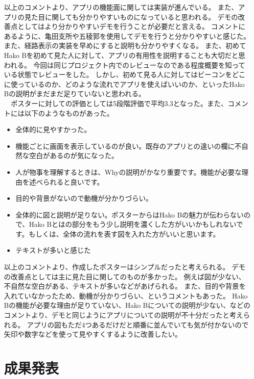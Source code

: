 \documentclass[openany,11pt,papersize]{jsbook}
\begin{document}
以上のコメントより、アプリの機能面に関しては実装が進んでいる。
また、アプリの見た目に関しても分かりやすいものになっていると思われる。
デモの改善点としてはより分かりやすいデモを行うことが必要だと言える。
コメントにあるように、亀田支所や五稜郭を使用してデモを行うと分かりやすいと感じた。
また、経路表示の実装を早めにすると説明も分かりやすくなる。
また、初めてHako Bを初めて見た人に対して、アプリの有用性を説明することも大切だと思われる。
今回は同じプロジェクト内でのレビューなのである程度概要を知っている状態でレビューをした。
しかし、初めて見る人に対してはビーコンをどこに使っているのか、どのような流れでアプリを使えばいいのか、といったHako Bの説明がまだまだ足りていないと思われる。\\
　ポスターに対しての評価としては5段階評価で平均3.3となった。また、コメントには以下のようなものがあった。
\begin{itemize}

\item 全体的に見やすかった。
\item 機能ごとに画面を表示しているのが良い。既存のアプリとの違いの欄に不自然な空白があるのが気になった。
\item 人が物事を理解するときは、Whyの説明がかなり重要です。機能が必要な理由を述べられると良いです。
\item 目的や背景がないので動機が分かりづらい。
\item 全体的に図と説明が足りない。ポスターからはHako Bの魅力が伝わらないので、Hako Bとはの部分をもう少し説明を濃くした方がいいかもしれないです。もしくは、全体の流れを表す図を入れた方がいいと思います。
\item テキストが多いと感じた

\end{itemize}
以上のコメントより、作成したポスターはシンプルだったと考えられる。
デモの改善点としては主に見た目に関してのものが多かった。
例えば図が少ない、不自然な空白がある、テキストが多いなどがあげられる。
また、目的や背景を入れていなかったため、動機が分かりづらい、というコメントもあった。
Hako Bの機能が必要な理由が足りていない、Hako Bについての説明が少ない、などのコメントより、デモと同じようにアプリについての説明が不十分だったと考えられる。
アプリの図もただ4つあるだけだと順番に並んでいても気が付かないので矢印や数字などを使って見やすくするように改善したい。



\chapter{成果発表}
\end{document}
